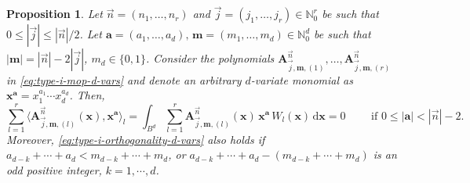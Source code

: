 \documentclass[a4paper]{article}
\theoremstyle{plain}
\newtheorem{proposition}[theorem]{Proposition}
\theoremstyle{definition}
\newcommand{\NN}{\mathbb{N}}
\newcommand{\dr}{\mathrm{d}}
\begin{document}
    \begin{proposition}\label{prop:type-i-orthogonality-d-vars}
        Let $\vec n = (n_1,\dots,n_r)$ and $ \vec j = (j_1,\dots,j_r)\in\NN_0^r$ be such that $0\leq |\vec j| \leq |\vec n|/2$. Let $\mathbf a=(a_1,\dots,a_d), \,\mathbf m =(m_1,\dots,m_d)\in\NN^d_0$ be such that $|\mathbf m|=|\vec n|-2|\vec j|$, $m_d\in\{0,1\}$. Consider the polynomials $\mathbf A_{\vec j,\mathbf m,(1)}^{\vec n},\dots, \mathbf A_{\vec j,\mathbf m,(r)}^{\vec n}$ in \eqref{eq:type-i-mop-d-vars} and denote an arbitrary $d$-variate monomial as $\mathbf x^{\mathbf a} = x_1^{a_1}\cdots x_d^{a_d}$. Then,
        \begin{equation}
            \label{eq:type-i-orthogonality-d-vars}
            \sum_{l=1}^r\langle\mathbf A_{\vec j,\mathbf m,(l)}^{\vec n}(\mathbf x), \mathbf x^{\mathbf a}\rangle_l=\int_{B^d}\sum_{l=1}^r \mathbf A_{\vec j,\mathbf m,(l)}^{\vec n}(\mathbf x)\, \mathbf x^{\mathbf a} \, W_l(\mathbf x)\, \dr \mathbf x =0\qquad\text{ if } 0\leq |\mathbf a|<|\vec n|-2.
        \end{equation}
        Moreover, \eqref{eq:type-i-orthogonality-d-vars} also holds if $a_{d-k}+\cdots+a_{d} < m_{d-k}+\cdots + m_{d}$, or $a_{d-k}+\cdots+a_{d} -( m_{d-k}+\cdots + m_{d})$ is an odd positive integer, $k=1,\cdots,d$.
    \end{proposition}
\end{document}
